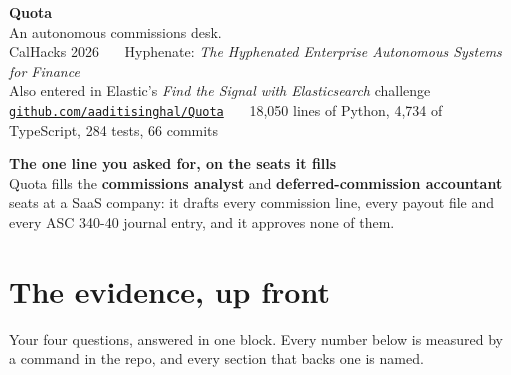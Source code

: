 \documentclass[10pt,a4paper]{article}
\newcommand{\lead}[1]{{\color{qgrey}\small #1}}
\begin{document}
\begin{center}
{\color{qorange}\Huge\bfseries Quota}\\[5pt]
{\large An autonomous commissions desk.}\\[10pt]
{\color{qgrey}\small CalHacks 2026 \ \textbullet\ \ Hyphenate: \emph{The Hyphenated Enterprise \textemdash{} Autonomous Systems for Finance}}\\[2pt]
{\color{qgrey}\small Also entered in Elastic's \emph{Find the Signal with Elasticsearch} challenge}\\[8pt]
{\small\href{https://github.com/aaditisinghal/Quota}{\texttt{github.com/aaditisinghal/Quota}} \ \textbullet\ \ 18{,}050 lines of Python, 4{,}734 of TypeScript, 284 tests, 66 commits}
\end{center}

\vspace{4pt}
\begin{moment}
\textbf{The one line you asked for, on the seats it fills}\\[3pt]
Quota fills the \textbf{commissions analyst} and \textbf{deferred-commission accountant} seats at a SaaS company: it drafts every commission line, every payout file and every ASC 340-40 journal entry, and it approves none of them.
\end{moment}

\vspace{2pt}
\section*{\color{qink}The evidence, up front}
\vspace{-6pt}
\lead{Your four questions, answered in one block. Every number below is measured by a command in the repo, and every section that backs one is named.}
\end{document}
